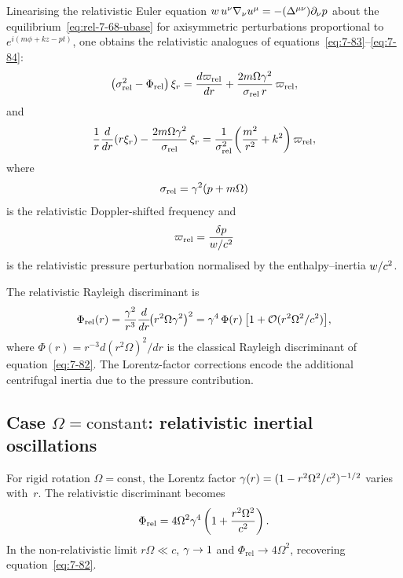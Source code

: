 Linearising the relativistic Euler equation
$w\, u^\nu \nabla_\nu u^\mu = -(\Delta^{\mu\nu})\partial_\nu p$
about the equilibrium~\eqref{eq:rel-7-68-ubase} for axisymmetric perturbations
proportional to $e^{i(m\phi+kz-pt)}$, one obtains the relativistic
analogues of equations~\eqref{eq:7-83}--\eqref{eq:7-84}:
\begin{equation}
\label{eq:rel-7-68-83}
\bigl(\sigma_{\mathrm{rel}}^2 - \Phi_{\mathrm{rel}}\bigr)\,\xi_r
= \frac{d\varpi_{\mathrm{rel}}}{dr}
  + \frac{2m\Omega\gamma^2}{\sigma_{\mathrm{rel}}\,r}\,\varpi_{\mathrm{rel}},
\end{equation}
and
\begin{equation}
\label{eq:rel-7-68-84}
\frac{1}{r}\frac{d}{dr}(r\xi_r)
- \frac{2m\Omega\gamma^2}{\sigma_{\mathrm{rel}}}\,\xi_r
= \frac{1}{\sigma_{\mathrm{rel}}^2}
  \!\left(\frac{m^2}{r^2}+k^2\right)\varpi_{\mathrm{rel}},
\end{equation}
where
\begin{equation}
\label{eq:rel-7-68-sigma}
\sigma_{\mathrm{rel}} = \gamma^2(p + m\Omega)
\end{equation}
is the relativistic Doppler-shifted frequency and
\begin{equation}
\label{eq:rel-7-68-varpi}
\varpi_{\mathrm{rel}} = \frac{\delta p}{w/c^2}
\end{equation}
is the relativistic pressure perturbation normalised by the
enthalpy--inertia $w/c^2$.

The relativistic Rayleigh discriminant is
\begin{equation}
\label{eq:rel-7-68-Phi}
\Phi_{\mathrm{rel}}(r)
= \frac{\gamma^2}{r^3}\frac{d}{dr}\!\bigl(r^2\Omega\gamma^2\bigr)^2
= \gamma^4\,\Phi(r)\,\bigl[1 + \mathcal{O}(r^2\Omega^2/c^2)\bigr],
\end{equation}
where $\Phi(r) = r^{-3}d(r^2\Omega)^2/dr$ is the classical Rayleigh
discriminant of equation~\eqref{eq:7-82}.  The Lorentz-factor
corrections encode the additional centrifugal inertia due to the
pressure contribution.

\subsection{Case $\Omega = \text{constant}$: relativistic inertial oscillations}
\label{sec:rel-7-68-const-Omega}

For rigid rotation $\Omega = \text{const}$, the Lorentz factor
$\gamma(r) = (1-r^2\Omega^2/c^2)^{-1/2}$ varies with~$r$.
The relativistic discriminant becomes
\begin{equation}
\label{eq:rel-7-68-Phi-const}
\Phi_{\mathrm{rel}} = 4\Omega^2\gamma^4
\left(1 + \frac{r^2\Omega^2}{c^2}\right).
\end{equation}
In the non-relativistic limit $r\Omega \ll c$, $\gamma \to 1$ and
$\Phi_{\mathrm{rel}} \to 4\Omega^2$, recovering equation~\eqref{eq:7-82}.

